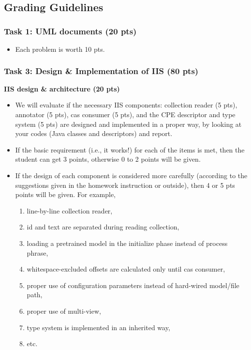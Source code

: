 
\newpage

\subsection{Grading Guidelines}

\subsubsection{Task 1: UML documents (20 pts)}

\begin{itemize}

\item Each problem is worth 10 pts. \\
 
\end{itemize}

\subsubsection{Task 3: Design \& Implementation of IIS (80 pts)}

\textbf{IIS design \& architecture (20 pts)}
 
\begin{itemize}

\item We will evaluate if the necessary IIS components: collection reader (5
pts), annotator (5 pts), cas consumer (5 pts), and the CPE descriptor and type
system (5 pts) are designed and implemented in a proper way, by looking at your
codes (Java classes and descriptors) and report.

\item If the basic requirement (i.e., it works!) for each of the items is met,
then the student can get 3 points, otherwise 0 to 2 points will be given.

\item If the design of each component is considered more carefully (according to
the suggestions given in the homework instruction or outside), then 4 or 5 pts
points will be given. For example,

\begin{enumerate}
\item line-by-line collection reader,
\item id and text are separated during reading collection,
\item loading a pretrained model in the initialize phase instead of process phrase,
\item whitespace-excluded offsets are calculated only until cas consumer,
\item proper use of configuration parameters instead of hard-wired model/file path,
\item proper use of multi-view,
\item type system is implemented in an inherited way,
\item etc.
\end{enumerate}

\end{itemize}

